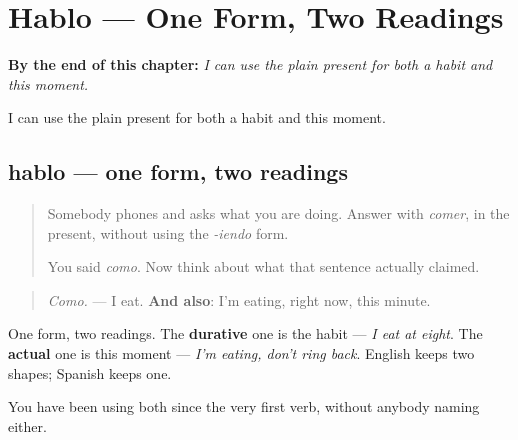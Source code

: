 
\chapter{Hablo --- One Form, Two Readings}
\label{ch:hablo-dos}

\begin{chapteropening}
\textbf{By the end of this chapter:} \emph{I can use the plain present for both a habit and this moment.}

I can use the plain present for both a habit and this moment.
\end{chapteropening}

\section[hablo]{hablo — one form, two readings}

\label{lesson:ES-C66-hablo-dos-lecturas}



\begin{quote}
Somebody phones and asks what you are doing. Answer with \emph{comer}, in the present, without using the \emph{-iendo} form.

You said \emph{como}. Now think about what that sentence actually claimed.
\end{quote}

\begin{grammarlens}[title={Grammar Lens: it was doing both all along}]
\begin{quote}
\emph{Como.} — I eat. \textbf{And also}: I'm eating, right now, this minute.
\end{quote}

One form, two readings. The \textbf{durative} one is the habit — \emph{I eat at eight}. The \textbf{actual} one is this moment — \emph{I'm eating, don't ring back}. English keeps two shapes; Spanish keeps one.

You have been using both since the very first verb, without anybody naming either.
\end{grammarlens}

